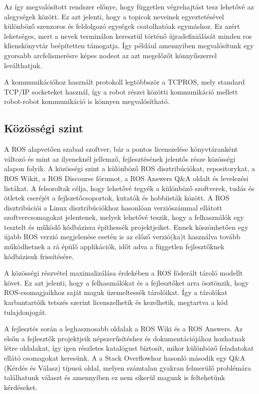 Az így megvalósított rendszer előnye, hogy független végrehajtást tesz lehetővé az alegységek között. Ez azt jelenti, hogy a topicok neveinek egyeztetésével különböző szenzoros és feldolgozó egységek csatolhatóak egymáshoz. Ez azért lehetséges, mert a nevek terminálon keresztül történő újradefiniálását minden ros klienskönyvtár beépítetten támogatja. Így például amennyiben megvalósítunk egy gyorsabb arcfelismerésre képes nodeot az azt megelőzőt könnyűszerrel leválthatjuk. 

A kommunikációhoz használt protokoll legtöbbször a TCPROS\cite{noauthor_rostcpros_nodate}, mely standard TCP/IP socketeket használ, így a robot részei közötti kommunikáció mellett robot-robot kommunikáció is könnyen megvalósítható.

\subsection{Közösségi szint}

A ROS alapvetően szabad szoftver\cite{noauthor_what_nodate}, bár a pontos licenszelése könyvtáranként változó és mint az ilyeneknél jellemző, fejlesztésének jelentős része közösségi alapon folyik. A közösségi szint a különböző ROS disztribúciókat,  repositorykat, a ROS Wikit\cite{noauthor_ros-wiki_nodate}, a ROS Discourse fórumot\cite{noauthor_ros-discourse_nodate}, a ROS Answers Q\&A oldalt\cite{noauthor_ros-answers_nodate} és levelezési listákat. A felsoroltak célja, hogy lehetővé tegyék a különböző szoftverek, tudás és ötletek cseréjét a fejlszetőcsoportok, kutatók és hobbiisták között. A ROS disztribúciói a Linux disztribúciókhoz hasonlóan verziószámmal ellátott szoftvercsomagokat jelentenek, melyek lehetővé teszik, hogy a felhasználók egy tesztelt és működő kódbázisra építhessék projektjeiket. Ennek köszönhetően egy újabb ROS verzió megjelenése esetén is az előző verzió(ka)t használva tovább működhetnek a rá épülő applikációk, időt adva a független fejlesztőknek kódbázisuk frissítésére.

A közösségi részvétel maximalizálása érdekében a ROS föderált tároló modellt követ. Ez azt jelenti, hogy a felhasználókat és a fejlesztőket arra ösztönzik, hogy ROS-csomagjaikhoz saját maguk üzemeltessék tárolóikat. Így a tárolókat karbantartóik tetszés szerint licenszelhetik és kezelhetik, megtartva a kód tulajdonjogát.

A fejlesztés során a leghasznosabb oldalak a ROS Wiki és a ROS Answers. Az elsőn a fejlesztők projektjeik népszerűsítéshez és dokumentációjához hozhatnak létre oldalakat, így igen részletes katalógust biztosít, mikor különböző feladatokat ellátó csomagokat keresünk. A a Stack Overflowhoz hasonló második egy Q\&A (Kérdés és Válasz) típusú oldal, melyen számtalan gyakran felmerülő problémára találhatunk választ és amennyiben ez nem sikerül magunk is feltehetünk kérdéseket.